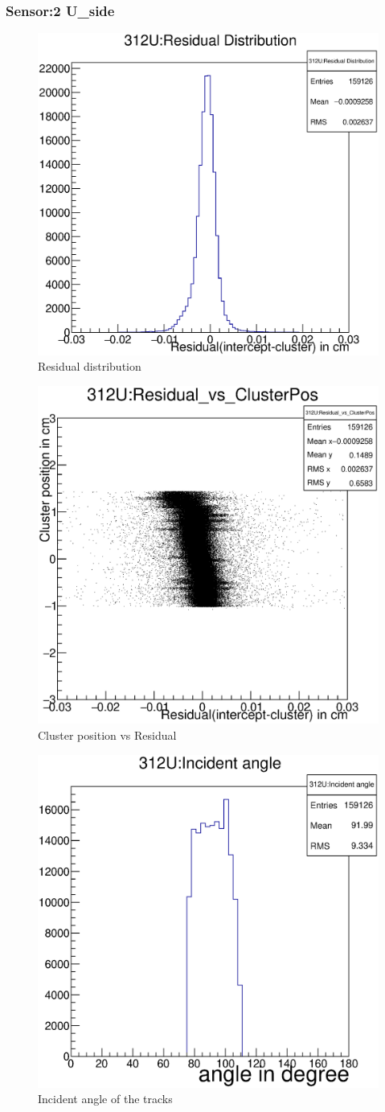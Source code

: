 \documentclass[12pt]{article}
\begin{document}
	\subsubsection{Sensor:2 U\_side}
	\begin{multicols}{3}
		
		\begin{figure}[H]
			\includegraphics[width=.3\textwidth]{312U:residualplot.eps}	
			\caption{Residual distribution}	
			\label{fig1}	
		\end{figure}
		\begin{figure}[H]
			\includegraphics[width=.3\textwidth]{312U:residual_vs_clusterpos.eps}	
			\caption{Cluster position vs Residual}	
			\label{fig2}	
		\end{figure}
		\begin{figure}[H]
			\includegraphics[width=.3\textwidth]{312U:incident_angle.eps}	
			\caption{Incident angle of the tracks}	
			\label{fig2}	
		\end{figure}
	\end{multicols}
	
\end{document}
